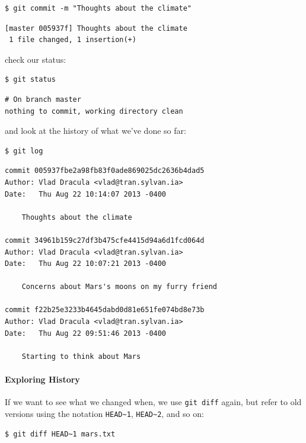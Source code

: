 \documentclass[]{book}
\begin{document}
\begin{verbatim}
$ git commit -m "Thoughts about the climate"
\end{verbatim}

\begin{verbatim}
[master 005937f] Thoughts about the climate
 1 file changed, 1 insertion(+)
\end{verbatim}

check our status:

\begin{verbatim}
$ git status
\end{verbatim}

\begin{verbatim}
# On branch master
nothing to commit, working directory clean
\end{verbatim}

and look at the history of what we've done so far:

\begin{verbatim}
$ git log
\end{verbatim}

\begin{verbatim}
commit 005937fbe2a98fb83f0ade869025dc2636b4dad5
Author: Vlad Dracula <vlad@tran.sylvan.ia>
Date:   Thu Aug 22 10:14:07 2013 -0400

    Thoughts about the climate

commit 34961b159c27df3b475cfe4415d94a6d1fcd064d
Author: Vlad Dracula <vlad@tran.sylvan.ia>
Date:   Thu Aug 22 10:07:21 2013 -0400

    Concerns about Mars's moons on my furry friend

commit f22b25e3233b4645dabd0d81e651fe074bd8e73b
Author: Vlad Dracula <vlad@tran.sylvan.ia>
Date:   Thu Aug 22 09:51:46 2013 -0400

    Starting to think about Mars
\end{verbatim}

\mbox{}\paragraph{Exploring History}

If we want to see what we changed when, we use \texttt{git diff} again,
but refer to old versions using the notation
\texttt{HEAD\textasciitilde{}1}, \texttt{HEAD\textasciitilde{}2}, and so
on:

\begin{verbatim}
$ git diff HEAD~1 mars.txt
\end{verbatim}
\end{document}
